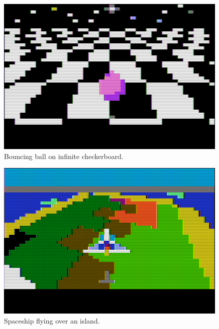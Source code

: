 \documentclass[twocolumn]{article}
\begin{document}
\begin{figure}[tb]
\begin{center}
\includegraphics[width=\columnwidth]{figures/m7_screen1.jpg}
\caption{Bouncing ball on infinite checkerboard.\label{fig:ball}}
\end{center}
\end{figure}

\begin{figure}[tb]
\begin{center}
\includegraphics[width=\columnwidth]{figures/m7_screen4.jpg}
\caption{Spaceship flying over an island.\label{fig:tb1}}
\end{center}
\end{figure}
\end{document}
